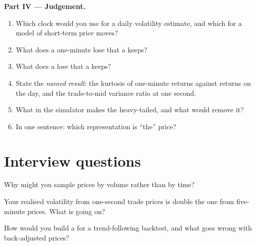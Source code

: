 \begin{problem}
\medskip\noindent\textbf{Part IV --- Judgement.}
\begin{enumerate}[resume]
\item Which clock would you use for a daily volatility estimate, and which for a model of short-term price moves?
\item What does a one-minute  lose that a  keeps?
\item What does a  lose that a  keeps?
\item State the \emph{named result}: the kurtosis of one-minute  returns against  returns on the day, and the
trade-to-mid variance ratio at one second.
\item What in the simulator makes the  heavy-tailed, and what would remove it?
\item In one sentence: which representation is ``the'' price?
\end{enumerate}
\end{problem}

\section{Interview questions}

\begin{interviewq}\label{iq:rs:market-data-for-research:1}
Why might you sample prices by volume rather than by time?
\end{interviewq}

\begin{interviewq}\label{iq:rs:market-data-for-research:2}
Your realised volatility from one-second trade prices is double the one from five-minute prices. What is going on?
\end{interviewq}

\begin{interviewq}\label{iq:rs:market-data-for-research:3}
How would you build a  for a trend-following backtest, and what goes wrong with back-adjusted prices?
\end{interviewq}

